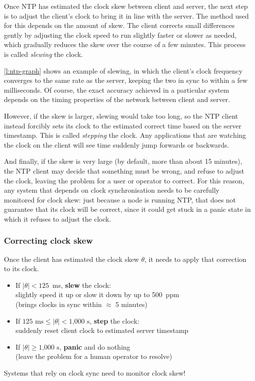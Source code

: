 Once NTP has estimated the clock skew between client and server, the next step is to adjust the client's clock to bring it in line with the server.
The method used for this depends on the amount of skew.
The client corrects small differences gently by adjusting the clock speed to run slightly faster or slower as needed, which gradually reduces the skew over the course of a few minutes.
This process is called \emph{slewing} the clock.

\autoref{l:ntp-graph} shows an example of slewing, in which the client's clock frequency converges to the same rate as the server, keeping the two in sync to within a few milliseconds.
Of course, the exact accuracy achieved in a particular system depends on the timing properties of the network between client and server.

However, if the skew is larger, slewing would take too long, so the NTP client instead forcibly sets its clock to the estimated correct time based on the server timestamp.
This is called \emph{stepping} the clock.
Any applications that are watching the clock on the client will see time suddenly jump forwards or backwards.

And finally, if the skew is very large (by default, more than about 15 minutes), the NTP client may decide that something must be wrong, and refuse to adjust the clock, leaving the problem for a user or operator to correct.
For this reason, any system that depends on clock synchronisation needs to be carefully monitored for clock skew: just because a node is running NTP, that does not guarantee that its clock will be correct, since it could get stuck in a panic state in which it refuses to adjust the clock.

\begin{frame}
    \label{s:ntp-slew}
    \frametitle{Correcting clock skew}
    Once the client has estimated the clock skew $\theta$, it needs to apply that correction to its clock.\\
    \begin{itemize}
        \item If $|\theta| < 125$~ms, \textbf{slew} the clock:\\
            slightly speed it up or slow it down by up to 500~ppm\\
            (brings clocks in sync within $\approx$ 5 minutes)\\[1em]\pause
        \item If $125\text{ ms} \le |\theta| < \text{1,000 s}$, \textbf{step} the clock:\\
            suddenly reset client clock to estimated server timestamp\\[1em]\pause
        \item If $|\theta| \ge \text{1,000 s}$, \textbf{panic} and do nothing\\
            (leave the problem for a human operator to resolve)\\[1em]
    \end{itemize}
    Systems that rely on clock sync need to monitor clock skew!
\end{frame}
\label{l:ntp-slew}

